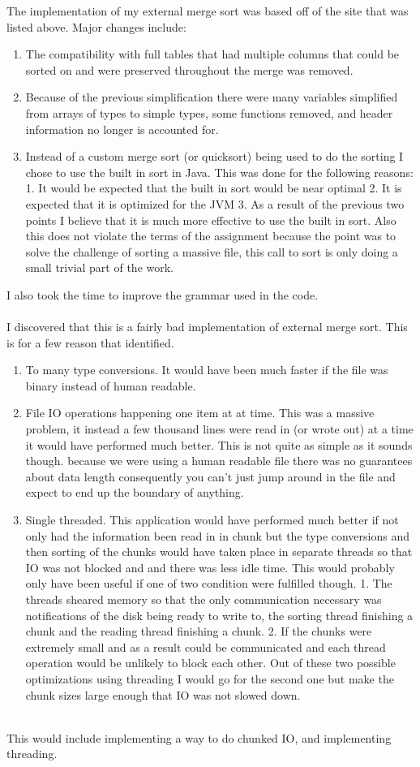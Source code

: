 \documentclass[11pt]{article}
\begin{document}
	The implementation of my external merge sort was based off of the site that was listed above. Major changes include:
	\begin{enumerate}
	\item The compatibility with full tables that had multiple columns that could be sorted on and were preserved throughout the merge was removed.
	\item Because of the previous simplification there were many variables simplified from arrays of types to simple types, some functions removed, and header information no longer is accounted for.
	\item Instead of a custom merge sort (or quicksort) being used to do the sorting I chose to use the built in sort in Java. This was done for the following reasons: 1. It would be expected that the built in sort would be near optimal 2. It is expected that it is optimized for the JVM 3. As a result of the previous two points I believe that it is much more effective to use the built in sort. Also this does not violate the terms of the assignment because the point was to solve the challenge of sorting a massive file, this call to sort is only doing a small trivial part of the work.
	\end{enumerate}
	I also took the time to improve the grammar used in the code.\\
	
	\newpage
	\\
	
	I discovered that this is a fairly bad implementation of external merge sort. This is for a few reason that identified. 
	\begin{enumerate}
	\item To many type conversions. It would have been much faster if the file was binary instead of human readable.
	\item File IO operations happening one item at at time. This was a massive problem, it instead a few thousand lines were read in (or wrote out) at a time it would have performed much better. This is not quite as simple as it sounds though. because we were using a human readable file there was no guarantees about data length consequently you can't just jump around in the file and expect to end up the boundary of anything.
	\item Single threaded. This application would have performed much better if not only had the information been read in in chunk but the type conversions and then sorting of the chunks would have taken place in separate threads so that IO was not blocked and and there was less idle time. This would probably only have been useful if one of two condition were fulfilled though. 1. The threads sheared memory so that the only communication necessary was notifications of the disk being ready to write to, the sorting thread finishing a chunk and the reading thread finishing a chunk. 2. If the chunks were extremely small and as a result could be communicated and each thread operation would be unlikely to block each other. Out of these two possible optimizations using threading I would go for the second one but make the chunk sizes large enough that IO was not slowed down.
	\end{enumerate}
	
	\\
	This would include implementing a way to do chunked IO, and implementing threading.
\end{document}
